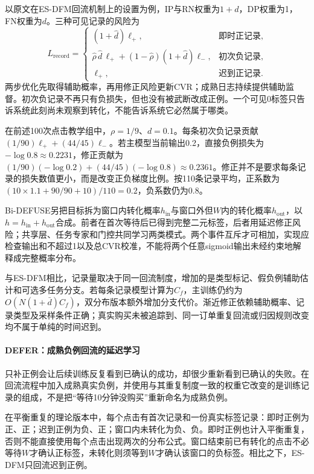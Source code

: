 以原文在ES-DFM回流机制上的设置为例，IP与RN权重为$1+d$，DP权重为1，FN权重为$d$。三种可见记录的风险为
\begin{equation}
  L_{\mathrm{record}}=
  \begin{cases}
    (1+\widehat d)\ell_+, & \text{即时正记录},\\
    \widehat\rho\,\widehat d\,\ell_+
      +(1-\widehat\rho)(1+\widehat d)\ell_-,
      & \text{初次负记录},\\
    \ell_+, & \text{迟到正记录}.
  \end{cases}
  \label{eq:rs-advertising-defuse}
\end{equation}
两步优化先取得辅助概率，再用修正风险更新CVR；成熟日志持续提供辅助监督。初次负记录不再只有负损失，但也没有被武断改成正例。一个可见0标签只告诉系统此刻尚未观察到转化，不能告诉系统它必然属于哪类。

在前述100次点击教学组中，$\rho=1/9$、$d=0.1$。每条初次负记录贡献$(1/90)\ell_++(44/45)\ell_-$。若主模型当前输出0.2，直接负例损失为$-\log0.8\approx0.2231$，修正贡献为$(1/90)(-\log0.2)+(44/45)(-\log0.8)\approx0.2361$。修正并不是要求每条记录的损失数值更小，而是改变正负梯度比例。按110条记录平均，正系数为$(10\times1.1+90/90+10)/110=0.2$，负系数仍为0.8。

Bi-DEFUSE另把目标拆为窗口内转化概率$h_{\mathrm{in}}$与窗口外但$W$内的转化概率$h_{\mathrm{out}}$，以$h=h_{\mathrm{in}}+h_{\mathrm{out}}$合成。前者在首次等待后已得到完整二元标签，后者用延迟修正风险；共享层、任务专家和门控共同学习两类模式。两个事件互斥才可相加，实现应检查输出和不超过1以及总CVR校准，不能将两个任意sigmoid输出未经约束地解释成完整概率分布。

与ES-DFM相比，记录量取决于同一回流制度，增加的是类型标记、假负例辅助估计和可选多任务分支。若每条记录模型计算为$C_f$，主训练仍约为$O(N(1+\bar d)C_f)$，双分布版本额外增加分支代价。渐近修正依赖辅助概率、记录类型及采样条件正确；真实购买未被追踪到、同一订单重复回流或归因规则改变均不属于单纯的时间迟到。

\paragraph{DEFER：成熟负例回流的延迟学习}
\label{sec:rs-advertising-defer}

只补正例会让后续训练反复看到已确认的成功，却很少重新看到已确认的失败。在回流流程中加入成熟真实负例，并使用与其重复制度一致的权重它改变的是训练记录的组成，不是把“等待10分钟没购买”重新命名为成熟负例。

在平衡重复的理论版本中，每个点击有首次记录和一份真实标签记录：即时正例为正、正；迟到正例为负、正；窗口内未转化为负、负。即时正例也计入平衡重复，否则不能直接使用每个点击出现两次的分布公式。窗口结束前已有转化的点击不必等待$W$才确认正标签，未转化则须等到$W$才确认该窗口的负标签。相比之下，ES-DFM只回流迟到正例。

